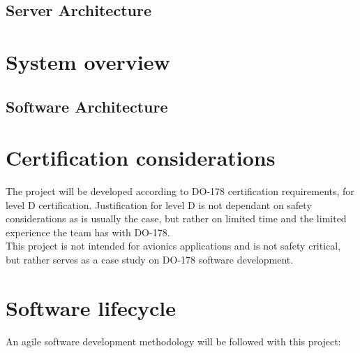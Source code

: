 \documentclass[a4paper]{article}
\begin{document}
\subsection{Server Architecture}
\newpage

\section{System overview}
\subsection{Software Architecture}
\newpage


\section{Certification considerations}
The project will be developed according to DO-178 certification requirements, for level D certification. Justification for level D is not dependant on safety considerations as is usually the case, but rather on limited time and the limited experience the team has with DO-178.\\
This project is not intended for avionics applications and is not safety critical, but rather serves as a case study on DO-178 software development.\\
\newpage

\section{Software lifecycle}
An agile software development methodology will be followed with this project:\\
\end{document}
